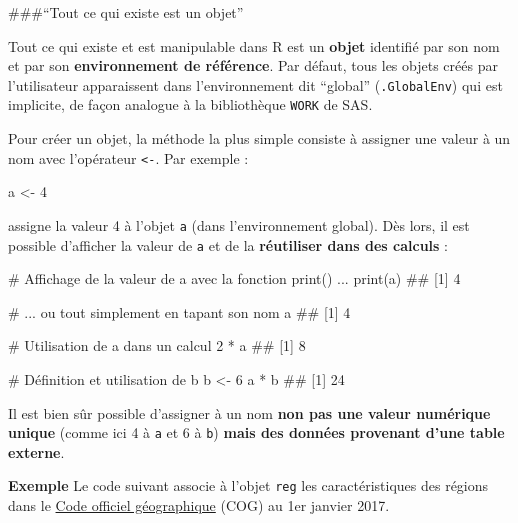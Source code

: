 \documentclass[12pt,twosided, notitlepage]{book}
\newenvironment{Shaded}{}{}
\newcommand{\CommentTok}[1]{\textcolor[rgb]{0.00,0.50,0.00}{#1}}
\newcommand{\DecValTok}[1]{#1}
\newcommand{\KeywordTok}[1]{\textcolor[rgb]{0.00,0.00,1.00}{#1}}
\newcommand{\NormalTok}[1]{#1}
\newcommand{\OperatorTok}[1]{#1}
\newcommand{\StringTok}[1]{\textcolor[rgb]{0.00,0.50,0.50}{#1}}
\renewenvironment{Shaded}{\begin{snugshade}}{\end{snugshade}}
\begin{document}
\#\#\#\enquote{Tout ce qui existe est un objet}

Tout ce qui existe et est manipulable dans R est un \textbf{objet}
identifié par son nom et par son \textbf{environnement de référence}.
Par défaut, tous les objets créés par l'utilisateur apparaissent dans
l'environnement dit \enquote{global} (\texttt{.GlobalEnv}) qui est
implicite, de façon analogue à la bibliothèque \texttt{WORK} de SAS.

Pour créer un objet, la méthode la plus simple consiste à assigner une
valeur à un nom avec l'opérateur
\texttt{\textless{}-}. Par exemple :

\begin{Shaded}
\begin{Highlighting}[]
\NormalTok{a <-}\StringTok{ }\DecValTok{4}
\end{Highlighting}
\end{Shaded}

assigne la valeur 4 à l'objet \texttt{a} (dans l'environnement global).
Dès lors, il est possible d'afficher la valeur de \texttt{a} et de la
\textbf{réutiliser dans des calculs} :

\begin{Shaded}
\begin{Highlighting}[]
\CommentTok{# Affichage de la valeur de a avec la fonction print() ...}
\KeywordTok{print}\NormalTok{(a)}
\NormalTok{  ## [1] 4}

\CommentTok{# ... ou tout simplement en tapant son nom}
\NormalTok{a}
\NormalTok{  ## [1] 4}

\CommentTok{# Utilisation de a dans un calcul}
\DecValTok{2} \OperatorTok{*}\StringTok{ }\NormalTok{a}
\NormalTok{  ## [1] 8}

\CommentTok{# Définition et utilisation de b}
\NormalTok{b <-}\StringTok{ }\DecValTok{6}
\NormalTok{a }\OperatorTok{*}\StringTok{ }\NormalTok{b}
\NormalTok{  ## [1] 24}
\end{Highlighting}
\end{Shaded}

Il est bien sûr possible d'assigner à un nom \textbf{non pas une valeur
numérique unique} (comme ici 4 à \texttt{a} et 6 à \texttt{b})
\textbf{mais des données provenant d'une table externe}.

\textbf{Exemple} Le code suivant associe à l'objet \texttt{reg} les
caractéristiques des régions dans le
\href{https://www.insee.fr/fr/information/2666684}{Code officiel
géographique} (COG) au 1er janvier 2017.
\end{document}
